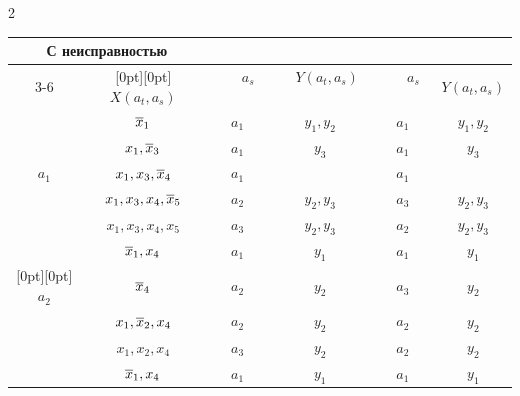 \begin{multicols}{2}
\begin{enumerate}[(1)]
\begin{table}
\begin{center}
\begin{tabular}{|c|c|c|c|c|c|}
\multicolumn{2}{|c|}{С неисправностью} \\


\cline{3-6}


\multicolumn{1}{|c|}{\raisebox{6pt}[0pt][0pt]{\ \ \ $a_t$\ \ \ }} &


\multicolumn{1}{|c|}{\raisebox{6pt}[0pt][0pt]{$X(a_t,a_s)$}}


&\ \ \ $a_s$\ \ \ &\ \ $Y(a_t,a_s)$\ \ &


 \ \ \ $a_s$\ \ \ & $Y(a_t,a_s)$ \\


\hline




 & $\overline x_1$ & $a_1$ & $y_1,y_2$ & $a_1$ & $y_1,y_2$ \\




 & $x_1,\overline x_3$ & $a_1$ & $y_3$ & $a_1$ & $y_3$ \\




$a_1$ & $x_1,x_3,\overline x_4$ & $a_1$ & & $a_1$ & \\




 & $x_1,x_3,x_4,\overline x_5$ & $a_2$ & $y_2,y_3$ & $a_3$ & $y_2,y_3$ \\




 & $x_1,x_3,x_4,x_5$ & $a_3$ & $y_2,y_3$ & $a_2$ & $y_2,y_3$ \\


\hline




 & $\overline x_1,x_4$ & $a_1$ & $y_1$ & $a_1$ & $y_1$ \\




\multicolumn{1}{|c|}{\raisebox{-6pt}[0pt][0pt]{$a_2$ }}& $\overline x_4$ & $a_2$ & $y_2$ & $a_3$ & $y_2$ \\




 & $x_1,\overline x_2,x_4$ & $a_2$ & $y_2$ & $a_2$ & $y_2$ \\




 & $x_1,x_2,x_4$ & $a_3$ & $y_2$ & $a_2$ & $y_2$ \\


\hline




 & $\overline x_1,x_4$ & $a_1$ & $y_1$ & $a_1$ & $y_1$ \\



\end{tabular}
\end{center}
\end{table}
\end{enumerate}
\end{multicols}

